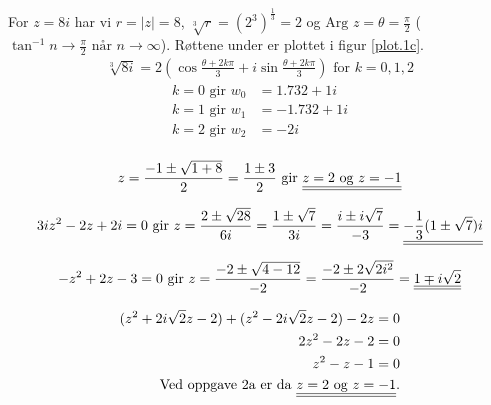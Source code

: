 \documentclass[a4paper,norsk,12pt]{article}
\begin{document}
For $z=8i$ har vi $r = |z| = 8$, $\sqrt[3]{r} = (2^3)^\frac{1}{3} = 2$ og
$\text{Arg }z = \theta = \frac{\pi}{2}$ ($\tan^{-1}{n} \to \frac{\pi}{2} \text{ når } n \to
\infty$). Røttene under er plottet i figur \vref{plot.1c}.
%
\begin{equation*}
\begin{split}
  \sqrt[3]{8i} = 2\left( \cos{\frac{\theta+2k\pi}{3}} +
  i\sin{\frac{\theta+2k\pi}{3}} \right) \text{ for } k = 0, 1, 2
\end{split}
\end{equation*}
%
\begin{equation*}
\begin{split}
  k = 0 \text{ gir } w_0 & = 1.732 + 1i \\
  k = 1 \text{ gir } w_1 & = -1.732 + 1i \\
  k = 2 \text{ gir } w_2 & = - 2i \\
\end{split}
\end{equation*}

\begin{equation*}
\begin{split}
  z = \frac{-1 \pm \sqrt{1+8}}{2} = \frac{1\pm 3}{2}
  \text{ gir } {\underline{\underline{z=2 \text{ og } z=-1}}}
\end{split}
\end{equation*}

\begin{equation*}
\begin{split}
  3iz^2 - 2z + 2i = 0 \text{ gir }
  z = \frac{2 \pm \sqrt{28}}{6i}
    = \frac{1 \pm \sqrt{7}}{3i}
    = \frac{i \pm i\sqrt{7}}{-3}
    = \svar{-\frac{1}{3}(1 \pm \sqrt{7})i} \\
\end{split}
\end{equation*}

\begin{equation*}
\begin{split}
  -z^2+2z-3=0 \text{ gir }
   z = \frac{-2 \pm \sqrt{4-12}}{-2}
    = \frac{-2 \pm 2\sqrt{2i^2}}{-2}
    = {\underline{\underline{1 \mp i\sqrt{2}}}}
\end{split}
\end{equation*}

\begin{equation*}
\begin{split}
  (z^2+2i\sqrt{2}z-2) +
  (z^2-2i\sqrt{2}z-2) - 2z = 0 \\
  2z^2 - 2z - 2 = 0 \\
  z^2 - z - 1 = 0 \\
  \text{Ved oppgave 2a er da } {\underline{\underline{z=2 \text{ og } z=-1}}}.
\end{split}
\end{equation*}
\end{document}
